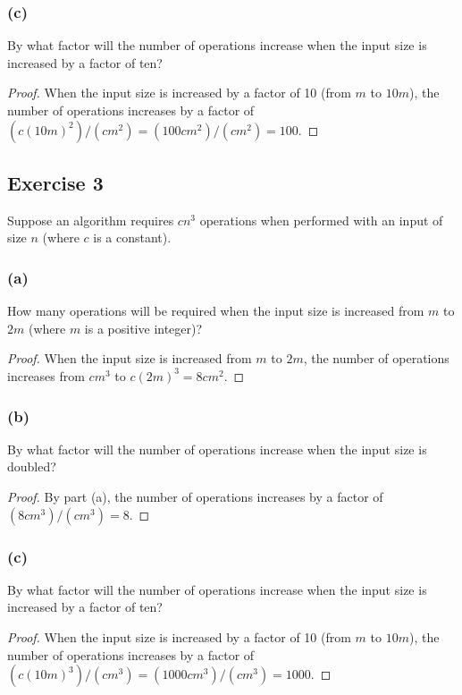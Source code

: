 \documentclass[14pt]{extarticle}
\begin{document}
\subsubsection{(c)}
By what factor will the number of operations increase when the input size is increased by a factor of ten?

\begin{proof}
When the input size is increased by a factor of 10 (from \(m\) to \(10m\)), the number of operations increases by a factor of 
\((c(10m)^2)/(cm^2) = (100cm^2)/(cm^2) = 100\).
\end{proof}

\subsection{Exercise 3}
Suppose an algorithm requires \(cn^3\) operations when performed with an input of size \(n\) (where \(c\) is a 
constant).

\subsubsection{(a)}
How many operations will be required when the input size is increased from \(m\) to \(2m\) (where \(m\) is a positive 
integer)?

\begin{proof}
When the input size is increased from \(m\) to \(2m\), the number of operations increases from \(cm^3\) to 
\(c(2m)^3 = 8cm^2\).
\end{proof}

\subsubsection{(b)}
By what factor will the number of operations increase when the input size is doubled?

\begin{proof}
By part (a), the number of operations increases by a factor of \((8cm^3)/(cm^3) = 8\).
\end{proof}

\subsubsection{(c)}
By what factor will the number of operations increase when the input size is increased by a factor of ten?

\begin{proof}
When the input size is increased by a factor of 10 (from \(m\) to \(10m\)), the number of operations increases by a factor of 
\((c(10m)^3)/(cm^3) = (1000cm^3)/(cm^3) = 1000\).
\end{proof}
\end{document}
